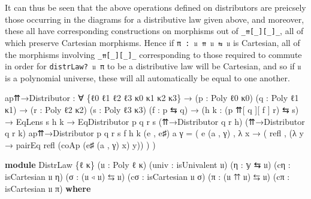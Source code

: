 \documentclass[
  11pt,
  oneside,
  article]{memoir}
\newenvironment{Shaded}{}{}
\newcommand{\KeywordTok}[1]{\textcolor[rgb]{0.00,0.44,0.13}{\textbf{#1}}}
\newcommand{\NormalTok}[1]{#1}
\newcommand{\OtherTok}[1]{\textcolor[rgb]{0.00,0.44,0.13}{#1}}
\theoremstyle{definition}
\theoremstyle{plain}
\newcommand{\0}{\textsf{0}}
\newcommand{\1}{\tn{\textsf{1}}}
\begin{document}
It can thus be seen that the above operations defined on distributors
are preicsely those occurring in the diagrams for a distributive law
given above, and moreover, these all have corresponding constructions on
morphisms out of \texttt{\_⇈{[}\_{]}{[}\_{]}\_}, all of which preserve
Cartesian morphisms. Hence if \texttt{π\ :\ 𝔲\ ⇈\ 𝔲\ ⇆\ 𝔲} is Cartesian,
all of the morphisms involving \texttt{\_⇈{[}\_{]}{[}\_{]}\_}
corresponding to those required to commute in order for
\texttt{distrLaw?\ 𝔲\ π} to be a distributive law will be Cartesian, and
so if \texttt{𝔲} is a polynomial universe, these will all automatically
be equal to one another.

\begin{Shaded}
\begin{Highlighting}[]
\NormalTok{ap⇈→Distributor }\OtherTok{:} \OtherTok{∀} \OtherTok{\{}\NormalTok{ℓ0 ℓ1 ℓ2 ℓ3 κ0 κ1 κ2 κ3}\OtherTok{\}}
                  \OtherTok{→} \OtherTok{(}\NormalTok{p }\OtherTok{:}\NormalTok{ Poly ℓ0 κ0}\OtherTok{)} \OtherTok{(}\NormalTok{q }\OtherTok{:}\NormalTok{ Poly ℓ1 κ1}\OtherTok{)}
                  \OtherTok{→} \OtherTok{(}\NormalTok{r }\OtherTok{:}\NormalTok{ Poly ℓ2 κ2}\OtherTok{)} \OtherTok{(}\NormalTok{s }\OtherTok{:}\NormalTok{ Poly ℓ3 κ3}\OtherTok{)} \OtherTok{(}\NormalTok{f }\OtherTok{:}\NormalTok{ p ⇆ q}\OtherTok{)}
                  \OtherTok{→} \OtherTok{(}\NormalTok{h k }\OtherTok{:} \OtherTok{(}\NormalTok{p ⇈[ q ][ f ] r}\OtherTok{)}\NormalTok{ ⇆ s}\OtherTok{)} \OtherTok{→}\NormalTok{ EqLens s h k }
                  \OtherTok{→}\NormalTok{ EqDistributor p q r s }\OtherTok{(}\NormalTok{⇈→Distributor q r h}\OtherTok{)}
                                          \OtherTok{(}\NormalTok{⇈→Distributor q r k}\OtherTok{)}
\NormalTok{ap⇈→Distributor p q r s f h k }\OtherTok{(}\NormalTok{e , e♯}\OtherTok{)}\NormalTok{ a γ }\OtherTok{=} 
    \OtherTok{(}\NormalTok{ e }\OtherTok{(}\NormalTok{a , γ}\OtherTok{)} 
\NormalTok{    , }\OtherTok{λ}\NormalTok{ x }\OtherTok{→} \OtherTok{(}\NormalTok{ refl , }\OtherTok{(λ}\NormalTok{ y }\OtherTok{→}\NormalTok{ pairEq refl }\OtherTok{(}\NormalTok{coAp }\OtherTok{(}\NormalTok{e♯ }\OtherTok{(}\NormalTok{a , γ}\OtherTok{)}\NormalTok{ x}\OtherTok{)}\NormalTok{ y}\OtherTok{))} \OtherTok{)} \OtherTok{)}

\KeywordTok{module}\NormalTok{ DistrLaw }\OtherTok{\{}\NormalTok{ℓ κ}\OtherTok{\}} \OtherTok{(}\NormalTok{𝔲 }\OtherTok{:}\NormalTok{ Poly ℓ κ}\OtherTok{)} \OtherTok{(}\NormalTok{univ }\OtherTok{:}\NormalTok{ isUnivalent 𝔲}\OtherTok{)}
                \OtherTok{(}\NormalTok{η }\OtherTok{:}\NormalTok{ 𝕪 ⇆ 𝔲}\OtherTok{)} \OtherTok{(}\NormalTok{cη }\OtherTok{:}\NormalTok{ isCartesian 𝔲 η}\OtherTok{)}
                \OtherTok{(}\NormalTok{σ }\OtherTok{:} \OtherTok{(}\NormalTok{𝔲 ◃ 𝔲}\OtherTok{)}\NormalTok{ ⇆ 𝔲}\OtherTok{)} \OtherTok{(}\NormalTok{cσ }\OtherTok{:}\NormalTok{ isCartesian 𝔲 σ}\OtherTok{)}
                \OtherTok{(}\NormalTok{π }\OtherTok{:} \OtherTok{(}\NormalTok{𝔲 ⇈ 𝔲}\OtherTok{)}\NormalTok{ ⇆ 𝔲}\OtherTok{)} \OtherTok{(}\NormalTok{cπ }\OtherTok{:}\NormalTok{ isCartesian 𝔲 π}\OtherTok{)} \KeywordTok{where}
    

\end{Highlighting}
\end{Shaded}
\end{document}

